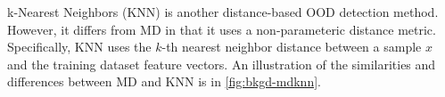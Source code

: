 k-Nearest Neighbors (KNN) \cite{sun2022out} is another distance-based OOD detection method. However, it differs from MD in that it uses a non-parameteric distance metric. Specifically, KNN uses the $k$-th nearest neighbor distance between a sample $x$ and the training dataset feature vectors. An illustration of the similarities and differences between MD and KNN is in \ref{fig:bkgd-mdknn}.


